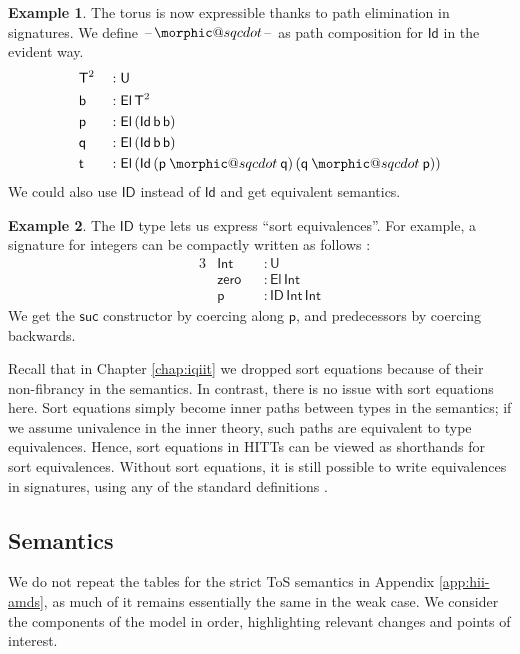 \documentclass[12pt,a4paper,twoside,openany]{book}
\makeatletter
\DeclareRobustCommand{\sqcdot}{\mathbin{\mathpalette\morphic@sqcdot\relax}}
\newcommand{\morphic@sqcdot}[2]{%
  \sbox\z@{$\m@th#1\centerdot$}%
  \ht\z@=.33333\ht\z@
  \vcenter{\box\z@}%
}
\theoremstyle{remark}
\theoremstyle{definition}
\newtheorem{myexample}{Example}
\theoremstyle{theorem}
\newcommand{\ms}[1]{\mathsf{#1}}
\newcommand{\zero}{\ms{zero}}
\newcommand{\suc}{\ms{suc}}
\newcommand{\U}{\mathsf{U}}
\newcommand{\El}{\mathsf{El}}
\newcommand{\Id}{\mathsf{Id}}
\newcommand{\ID}{\mathsf{ID}}
\newcommand{\blank}{\mathord{\hspace{1pt}\text{--}\hspace{1pt}}}
\newcommand{\p}{\mathsf{p}}
\newcommand{\q}{\mathsf{q}}
\makeatother
\begin{document}
\begin{myexample}
The torus is now expressible thanks to path elimination in signatures. We define
$\blank\!\sqcdot\!\blank$ as path composition for $\Id$ in the evident way.
\begin{alignat*}{3}
  &\ms{T}^2  &&: \U\\
  &\ms{b}    &&: \El\,\ms{T}^2\\
  &\ms{p}    &&: \El\,(\Id\,\ms{b}\,\ms{b})\\
  &\ms{q}    &&: \El\,(\Id\,\ms{b}\,\ms{b})\\
  &\ms{t}    &&: \El\,(\Id\,(\p \sqcdot \q)\,(\q \sqcdot \p))
\end{alignat*}
We could also use $\ID$ instead of $\Id$ and get equivalent semantics.
\end{myexample}

\begin{myexample}
The $\ID$ type lets us express ``sort equivalences''. For example, a signature
for integers can be compactly written as follows \cite{hit-integers}:
\begin{alignat*}{3}
  &\ms{Int}  &&: \U\\
  &\zero     &&: \El\,\ms{Int}\\
  &\p        &&: \ID\,\ms{Int}\,\ms{Int}
\end{alignat*}
We get the $\suc$ constructor by coercing along $\p$, and predecessors by
coercing backwards.


Recall that in Chapter \ref{chap:iqiit} we dropped sort equations because of
their non-fibrancy in the semantics. In contrast, there is no issue with sort
equations here. Sort equations simply become inner paths between types in the
semantics; if we assume univalence in the inner theory, such paths are
equivalent to type equivalences. Hence, sort equations in HITTs can be viewed as
shorthands for sort equivalences. Without sort equations, it is still possible
to write equivalences in signatures, using any of the standard definitions
\cite[Chapter~4]{hottbook}.
\end{myexample}

\subsection{Semantics}

We do not repeat the tables for the strict ToS semantics in Appendix
\ref{app:hii-amds}, as much of it remains essentially the same in the weak
case. We consider the components of the model in order, highlighting relevant
changes and points of interest.
\end{document}
